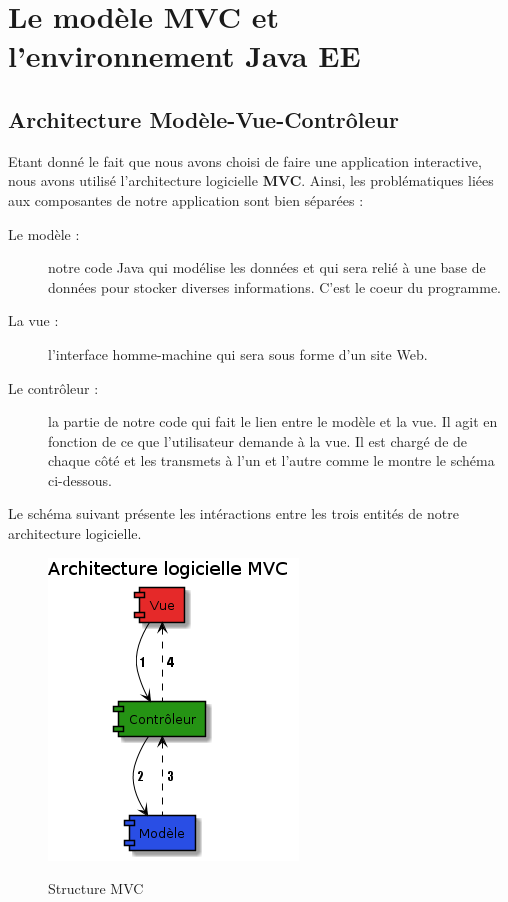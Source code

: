 \section{Le modèle MVC et l'environnement Java EE}

\subsection{Architecture Modèle-Vue-Contrôleur}
Etant donné le fait que nous avons choisi de faire une application interactive, nous avons utilisé l'architecture logicielle \textbf{MVC}. Ainsi, les problématiques liées aux composantes de notre application sont bien séparées :
\begin{description}
 \item[Le modèle :] notre code Java qui modélise les données et qui sera relié à une base de données pour stocker diverses informations. C'est le coeur du programme.
 \item[La vue :] l'interface homme-machine qui sera sous forme d'un site Web.
 \item[Le contrôleur :] la partie de notre code qui fait le lien entre le modèle et la vue. Il agit en fonction de ce que l'utilisateur demande à la vue. Il est chargé de de chaque côté et les transmets à l'un et l'autre comme le montre le schéma ci-dessous.\\
\end{description}

Le schéma suivant présente les intéractions entre les trois entités de notre architecture logicielle.
\begin{figure}[H]
  \center
  \includegraphics[scale=0.6]{../graph/MVC.png} \\
  \caption{Structure MVC}
\end{figure}

